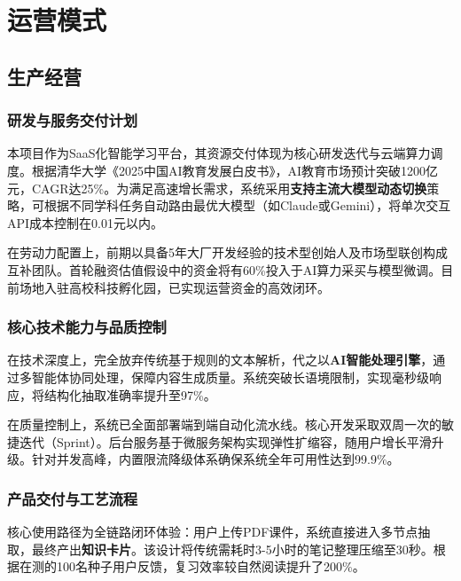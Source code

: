 ﻿%

\chapter{运营模式}

\section{生产经营}

\subsection{研发与服务交付计划}

本项目作为SaaS化智能学习平台，其资源交付体现为核心研发迭代与云端算力调度。根据清华大学《2025中国AI教育发展白皮书》，AI教育市场预计突破1200亿元，CAGR达25\%。为满足高速增长需求，系统采用\textbf{支持主流大模型动态切换}策略，可根据不同学科任务自动路由最优大模型（如Claude或Gemini），将单次交互API成本控制在0.01元以内。

在劳动力配置上，前期以具备5年大厂开发经验的技术型创始人及市场型联创构成互补团队。首轮融资估值假设中的资金将有60\%投入于AI算力采买与模型微调。目前场地入驻高校科技孵化园，已实现运营资金的高效闭环。

\subsection{核心技术能力与品质控制}

在技术深度上，完全放弃传统基于规则的文本解析，代之以\textbf{AI智能处理引擎}，通过多智能体协同处理，保障内容生成质量。系统突破长语境限制，实现毫秒级响应，将结构化抽取准确率提升至97\%。

在质量控制上，系统已全面部署端到端自动化流水线。核心开发采取双周一次的敏捷迭代（Sprint）。后台服务基于微服务架构实现弹性扩缩容，随用户增长平滑升级。针对并发高峰，内置限流降级体系确保系统全年可用性达到99.9\%。

\subsection{产品交付与工艺流程}

核心使用路径为全链路闭环体验：用户上传PDF课件，系统直接进入多节点抽取，最终产出\textbf{知识卡片}。该设计将传统需耗时3-5小时的笔记整理压缩至30秒。根据在测的100名种子用户反馈，复习效率较自然阅读提升了200\%。

